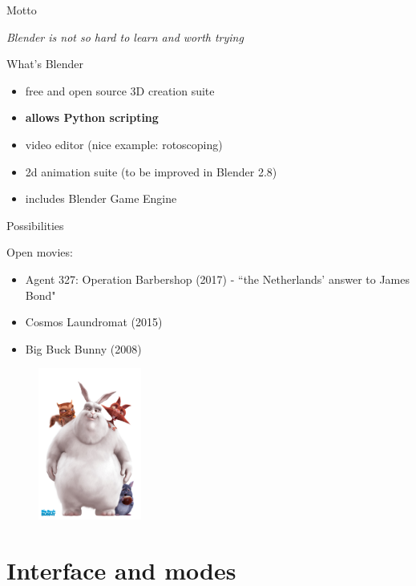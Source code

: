 \documentclass{beamer}
\begin{document}
\begin{frame}{Motto}

\centering \Huge
\emph{Blender is not so hard to learn and worth trying}

\end{frame}

\begin{frame}{What's Blender}

\begin{itemize}
  \item free and open source 3D creation suite
  \item \textbf{allows Python scripting}
  \item video editor (nice example: rotoscoping)
  \item 2d  animation suite (to be improved in Blender 2.8)
  \item includes Blender Game Engine
\end{itemize}

\end{frame}

\begin{frame}{Possibilities}

Open movies:
\begin{itemize}
	\item Agent 327: Operation Barbershop (2017) - “the Netherlands’ answer to 
	James Bond"
	\item Cosmos Laundromat (2015)
	\item Big Buck Bunny (2008)
\end{itemize}

\begin{figure}
	\includegraphics[keepaspectratio,height=5cm]{big_big_buck_bunny.jpg}
\end{figure}

\end{frame}

\section{Interface and modes}
\end{document}
